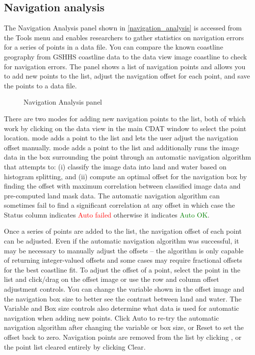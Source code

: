 \subsection{Navigation analysis}
\label{nav_analysis_section}

The {\gui Navigation Analysis} panel shown in
\autoref{navigation_analysis} is accessed from the {\gui Tools}
menu and enables researchers to gather statistics on navigation
errors for a series of points in a data file.  You can compare
the known coastline geography from GSHHS coastline data to the
data view image coastline to check for navigation errors.  The
panel shows a list of navigation points and allows you to add new
points to the list, adjust the navigation offset for each point,
and save the points to a data file.

\begin{figure}
  \begin{center}
    \caption[Navigation Analysis panel]{
       {\gui Navigation Analysis} panel
    }
    \label{navigation_analysis}
  \end{center}
\end{figure}

There are two modes for adding new navigation points to the list,
both of which work by clicking on the data view in the main CDAT
window to select the point location.  
mode adds a point to the list and lets the user adjust the
navigation offset manually.   mode
adds a point to the list and additionally runs the image data in
the box surrounding the point through an automatic navigation
algorithm that attempts to: (i) classify the image data into land
and water based on histogram splitting, and (ii) compute an
optimal offset for the navigation box by finding the offset with
maximum correlation between classified image data and
pre-computed land mask data.  The automatic navigation algorithm
can sometimes fail to find a significant correlation at any
offset in which case the {\gui Status} column indicates
\textcolor{red}{{\gui Auto failed}} otherwise it indicates
\textcolor{green}{{\gui Auto OK}}.

Once a series of points are added to the list, the navigation
offset of each point can be adjusted.  Even if the automatic
navigation algorithm was successful, it may be necessary to
manually adjust the offsets -- the algorithm is only capable of
returning integer-valued offsets and some cases may require
fractional offsets for the best coastline fit.  To adjust the
offset of a point, select the point in the list and click/drag on
the offset image or use the row and column offset adjustment
controls.  You can change the variable shown in the offset image
and the navigation box size to better see the contrast between
land and water.  The {\gui Variable} and {\gui Box size} controls
also determine what data is used for automatic navigation when
adding new points.  Click {\gui Auto} to re-try the automatic
navigation algorithm after changing the variable or box size, or
{\gui Reset} to set the offset back to zero.  Navigation points
are removed from the list by clicking , or
the point list cleared entirely by clicking {\gui Clear}.

